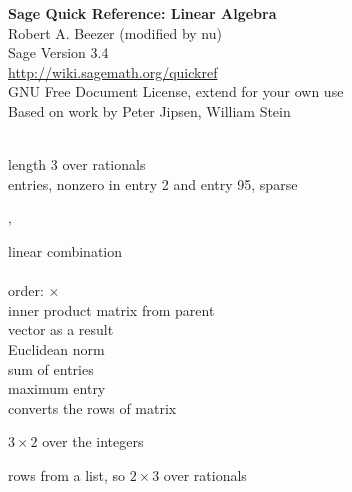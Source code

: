 \documentclass[a4paper]{article}
\begin{document}
\begin{multicols*}{3}
\begin{center}
\textbf{Sage Quick Reference: Linear Algebra}\\
Robert A. Beezer (modified by nu)\\
Sage Version 3.4\\
\url{http://wiki.sagemath.org/quickref}\\
GNU Free Document License, extend for your own use\\
Based on work by Peter Jipsen, William Stein 
\end{center}
\vspace{-2ex}

\\
 length 3 over rationals\\
                   entries, nonzero in entry 2 and entry 95, sparse


,

 linear combination\\
\\
  order: $\times$\\
  inner product matrix from parent\\
 vector as a result\\
 Euclidean norm\\
 sum of entries\\
 maximum entry\\
 converts the rows of matrix 



 \BreakLineAndIndent
 $3\times 2$ over the integers

     rows from a list, so $2\times 3$ over rationals


\end{multicols*}
\end{document}
